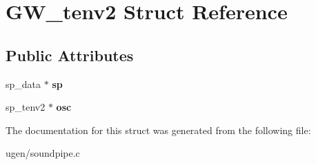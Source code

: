 \hypertarget{structGW__tenv2}{}\section{G\+W\+\_\+tenv2 Struct Reference}
\label{structGW__tenv2}
\subsection*{Public Attributes}
\begin{DoxyCompactItemize}
\item 
\hypertarget{structGW__tenv2_a399443ff19fe8954265f980f160fbfc1}{}\label{structGW__tenv2_a399443ff19fe8954265f980f160fbfc1} 
sp\+\_\+data $\ast$ {\bfseries sp}
\item 
\hypertarget{structGW__tenv2_a43885aa5955b5cac0b2fe12c88443543}{}\label{structGW__tenv2_a43885aa5955b5cac0b2fe12c88443543} 
sp\+\_\+tenv2 $\ast$ {\bfseries osc}
\end{DoxyCompactItemize}


The documentation for this struct was generated from the following file\+:\begin{DoxyCompactItemize}
\item 
ugen/soundpipe.\+c\end{DoxyCompactItemize}

